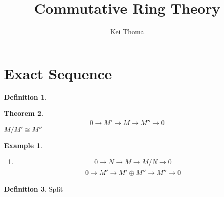 \documentclass[a4paper]{book}
\title{Commutative Ring Theory}
\author{Kei Thoma}
\theoremstyle{definition}
\newtheorem{definition}{Definition}[]
\newtheorem{example}{Example}[definition]
\newtheorem{theorem}[definition]{Theorem}
\begin{document}
\section{Exact Sequence}
\begin{defbox}
    \begin{definition}
        
    \end{definition}
\end{defbox}
\begin{thmbox}
    \begin{theorem}
        \begin{align*}
            0 \longrightarrow M' \longrightarrow M \longrightarrow M'' \longrightarrow 0
        \end{align*}
        \(M / M' \cong M''\)
    \end{theorem}
\end{thmbox}
\begin{exmbox}
    \begin{example}
        \begin{enumerate}
            \item
            \begin{align*}
                0 \longrightarrow N \longrightarrow M \longrightarrow M / N \longrightarrow 0
            \end{align*}
            \begin{align*}
                0 \longrightarrow M' \longrightarrow M' \oplus M'' \longrightarrow M'' \longrightarrow 0
            \end{align*}
        \end{enumerate}
    \end{example}
\end{exmbox}
\begin{defbox}
    \begin{definition}
        Split
    \end{definition}
\end{defbox}
\end{document}
